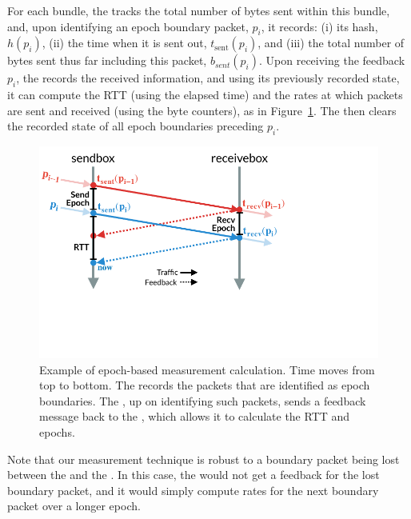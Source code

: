For each bundle, the \inbox tracks the total number of bytes sent within this bundle, and, upon identifying an epoch boundary packet, $p_i$, it records: (i) its hash, $h(p_i)$, (ii) the time when it is sent out, $t_{\text{sent}}(p_i)$, and (iii) the total number of bytes sent thus far including this packet, $b_{sent}(p_i)$. 
Upon receiving the feedback $p_i$, the \inbox records the received information, and using its previously recorded state, it can compute the RTT (using the elapsed time) and the rates at which packets are sent and received (using the byte counters), as in Figure~\ref{fig:ratecalc}.
The \inbox then clears the recorded state of all epoch boundaries preceding $p_i$.

\begin{figure}
    \centering
    \includegraphics[width=\columnwidth]{img/rate-calculation}
    \caption{Example of epoch-based measurement calculation. Time moves from top to bottom.
    The \inbox records the packets that are identified as epoch boundaries. 
    The \outbox, up on identifying such packets, sends a feedback message back to
    the \inbox, which allows it to calculate the RTT and epochs.
    }\label{fig:ratecalc}
\end{figure}

Note that our measurement technique is robust to a boundary packet being lost between the \inbox and the \outbox. In this case, the \inbox would not get a feedback for the lost boundary packet, and it would simply compute rates for the next boundary packet over a longer epoch. 

